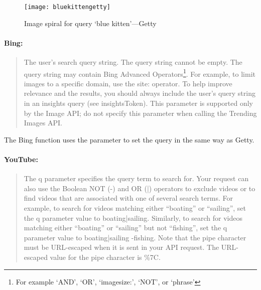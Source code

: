 \begin{figure}[!htbp]
\centering
  \texttt{[image: bluekittengetty]}
\caption[Image spiral `blue kitten'---Getty]{Image spiral for query `blue kitten'---Getty}
\label{fig:imgspiralgetty}
\end{figure}

\paragraph{Bing:}
\begin{quotation}
  \begin{description}
  \vspace{-1cm}
    \item[query] The user's search query string. The query string cannot be empty. The query string may contain Bing Advanced Operators\footnote{For example `AND', `OR', `imagesize:', `NOT', or `phrase'}. For example, to limit images to a specific domain, use the site: operator. To help improve relevance and the results, you should always include the user's query string in an insights query (see insightsToken). This parameter is supported only by the Image API; do not specify this parameter when calling the Trending Images API.
  \end{description}
\end{quotation}

The Bing function uses the  parameter to set the query in the same way as Getty.

\paragraph{YouTube:}
\begin{quotation}
  \begin{description}
  \vspace{-1cm}
    \item[q] The q parameter specifies the query term to search for. Your request can also use the Boolean NOT (-) and OR (|) operators to exclude videos or to find videos that are associated with one of several search terms. For example, to search for videos matching either ``boating'' or ``sailing'', set the q parameter value to boating|sailing. Similarly, to search for videos matching either ``boating'' or ``sailing'' but not ``fishing'', set the q parameter value to boating|sailing -fishing. Note that the pipe character must be URL-escaped when it is sent in your API request. The URL-escaped value for the pipe character is \%7C.
  \end{description}
\end{quotation}

